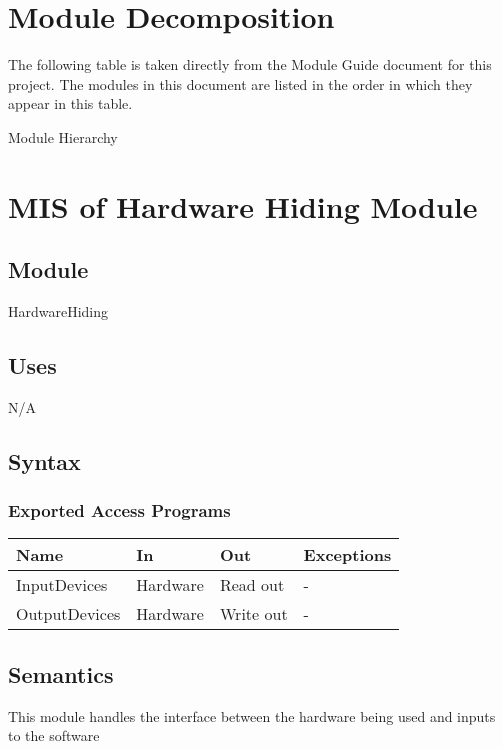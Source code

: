 \documentclass[12pt, titlepage]{article}
\begin{document}
\section{Module Decomposition}

The following table is taken directly from the Module Guide document for this
project. The modules in this document are listed in the order in which they
appear in this table.

\begin{table}[h!]
    \centering
    
    \caption{Module Hierarchy}
    \label{TblMH}
\end{table}

\newpage

\section{MIS of Hardware Hiding Module} \label{Mod:HH}

\subsection{Module}
HardwareHiding

\subsection{Uses}
N/A

\subsection{Syntax}

\subsubsection{Exported Access Programs}

\begin{center}
    \begin{tabular}{p{3cm} p{4cm} p{4cm} p{2cm}}
        \hline
        \textbf{Name} & \textbf{In} & \textbf{Out} & \textbf{Exceptions} \\
        \hline
        InputDevices & Hardware & Read out & - \\
        OutputDevices & Hardware & Write out & - \\
        \hline
    \end{tabular}
\end{center}

\subsection{Semantics}
This module handles the interface between the hardware being used and inputs to
the software
\end{document}
